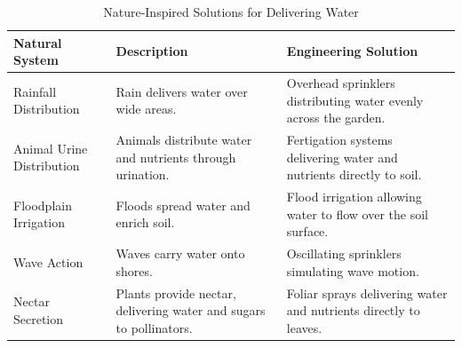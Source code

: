 \documentclass[12pt]{article}
\begin{document}
\begin{table}[h!]
    \centering
    \caption{Nature-Inspired Solutions for Delivering Water}
    \begin{tabular}{p{4cm} p{5.5cm} p{5.5cm}}
        \toprule
        \textbf{Natural System} & \textbf{Description} & \textbf{Engineering Solution} \\
        \midrule
        Rainfall Distribution & Rain delivers water over wide areas. & Overhead sprinklers distributing water evenly across the garden. \\
        Animal Urine Distribution & Animals distribute water and nutrients through urination. & Fertigation systems delivering water and nutrients directly to soil. \\
        Floodplain Irrigation & Floods spread water and enrich soil. & Flood irrigation allowing water to flow over the soil surface. \\
        Wave Action & Waves carry water onto shores. & Oscillating sprinklers simulating wave motion. \\
        Nectar Secretion & Plants provide nectar, delivering water and sugars to pollinators. & Foliar sprays delivering water and nutrients directly to leaves. \\
        \bottomrule
    \end{tabular}
    \label{tab:deliver_water}
\end{table}
\end{document}
